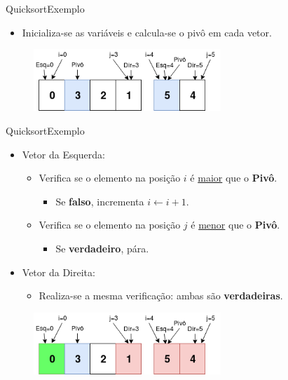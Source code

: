 \documentclass[aspectratio=169]{beamer}
\begin{document}

\begin{frame}{Quicksort}{Exemplo}
\begin{itemize}
 \item Inicializa-se as variáveis e calcula-se o pivô em cada vetor.
 \end{itemize}

\begin{figure}[!h]
  \centering
  \includegraphics[width=200pt]{imgs/quick/quick23.png}
  \label{fig_quick23}
\end{figure}

\end{frame}


\begin{frame}{Quicksort}{Exemplo}
\begin{itemize}
 \item Vetor da Esquerda:
\begin{itemize}
 \item Verifica se o elemento na posição $i$ é \underline{maior} que o {\bf Pivô}.
  \begin{itemize}
 \item Se {\bf falso}, incrementa $i\leftarrow i + 1$.
 \end{itemize}
 \item Verifica se o elemento na posição $j$ é \underline{menor} que o {\bf Pivô}.
 \begin{itemize}
  \item Se {\bf verdadeiro}, pára.
 \end{itemize}
\end{itemize}
\item Vetor da Direita:
\begin{itemize}
\item Realiza-se a mesma verificação: ambas são {\bf verdadeiras}.	
\end{itemize}
\end{itemize}
 
\begin{figure}[!h]
  \centering
  \includegraphics[width=200pt]{imgs/quick/quick24.png}
  \label{fig_quick24}
\end{figure}

\end{frame}
\end{document}
